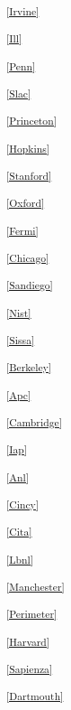 \begin{multicols}{2}

\scriptsize

\parskip=4pt

\noindent
\textsuperscript{\ref{Irvine}}\Irvinetext

\noindent
\textsuperscript{\ref{Ill}}\Illtext

\noindent
\textsuperscript{\ref{Penn}}\Penntext

\noindent
\textsuperscript{\ref{Slac}}\Slactext

\noindent
\textsuperscript{\ref{Princeton}}\Princetontext

\noindent
\textsuperscript{\ref{Hopkins}}\Hopkinstext

\noindent
\textsuperscript{\ref{Stanford}}\Stanfordtext

\noindent
\textsuperscript{\ref{Oxford}}\Oxfordtext

\noindent
\textsuperscript{\ref{Fermi}}\Fermitext

\noindent
\textsuperscript{\ref{Chicago}}\Chicagotext

\noindent
\textsuperscript{\ref{Sandiego}}\Sandiegotext

\noindent
\textsuperscript{\ref{Nist}}\Nisttext

\noindent
\textsuperscript{\ref{Sissa}}\Sissatext

\noindent
\textsuperscript{\ref{Berkeley}}\Berkeleytext

\noindent
\textsuperscript{\ref{Apc}}\Apctext

\noindent
\textsuperscript{\ref{Cambridge}}\Cambridgetext

\noindent
\textsuperscript{\ref{Iap}}\Iaptext

\noindent
\textsuperscript{\ref{Anl}}\Anltext

\noindent
\textsuperscript{\ref{Cincy}}\Cincytext

\noindent
\textsuperscript{\ref{Cita}}\Citatext

\noindent
\textsuperscript{\ref{Lbnl}}\Lbnltext

\noindent
\textsuperscript{\ref{Manchester}}\Manchestertext

\noindent
\textsuperscript{\ref{Perimeter}}\Perimetertext

\noindent
\textsuperscript{\ref{Harvard}}\Harvardtext

\noindent
\textsuperscript{\ref{Sapienza}}\Sapienzatext

\noindent
\textsuperscript{\ref{Dartmouth}}\Dartmouthtext


\end{multicols}
